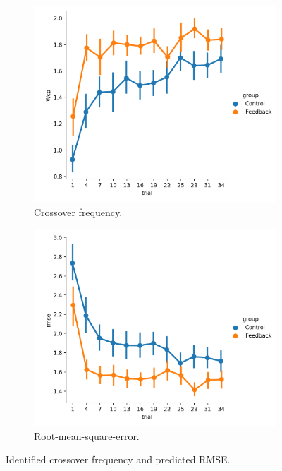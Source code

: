 \begin{figure}[t]
    \centering
    \begin{subfigure}[h]{0.49\textwidth}
        \centering
        \includegraphics[width=\linewidth]{figures/wcp.png}
        \caption[Crossover frequency]{Crossover frequency.}
        \label{fig:sm_crossover}
    \end{subfigure}
    \hfill
    \begin{subfigure}[h]{0.49\textwidth}
        \centering
        \includegraphics[width=\linewidth]{figures/rmse.png}
        \caption[Root-mean-square-error]{Root-mean-square-error.}
        \label{fig:sm_rmse}
    \end{subfigure}
    \caption[Identified crossover frequency and predicted RMSE]{Identified crossover frequency and predicted RMSE.}
\end{figure}

